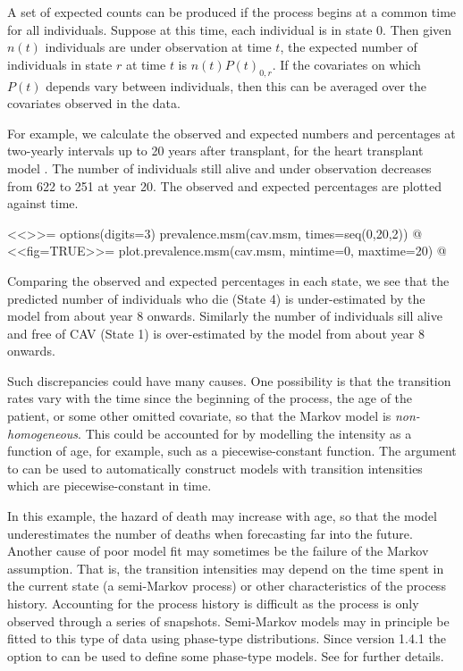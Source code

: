 A set of expected counts can be produced if the process begins at a
common time for all individuals.  Suppose at this time, each
individual is in state 0.  Then given $n(t)$ individuals are under
observation at time $t$, the expected number of individuals in state
$r$ at time $t$ is $n(t) P(t)_{0,r}$.   If the covariates on which
$P(t)$ depends vary between individuals, then this can be
averaged over the covariates observed in the data.

For example, we calculate the observed and expected numbers and
percentages at two-yearly intervals up to 20 years after transplant,
for the heart transplant model .  The number of
individuals still alive and under observation decreases from 622 to
251 at year 20.  The observed and expected percentages are plotted
against time.

<<>>=
options(digits=3)
prevalence.msm(cav.msm, times=seq(0,20,2))
@
<<fig=TRUE>>=
plot.prevalence.msm(cav.msm, mintime=0, maxtime=20)
@

Comparing the observed and expected percentages in each state,
we see that the predicted number of individuals who die (State 4) is
under-estimated by the model from about year 8 onwards.  Similarly the
number of individuals sill alive and free of CAV (State 1) is
over-estimated by the model from about year 8 onwards.

Such discrepancies could have many causes.  One possibility is that
the transition rates vary with the time since the beginning of the
process, the age of the patient, or some other omitted covariate, so
that the Markov model is {\em non-homogeneous}.  This could be
accounted for by modelling the intensity as a function of age, for
example, such as a piecewise-constant function.  The 
argument to  can be used to automatically construct
models with transition intensities which are piecewise-constant in
time.

In this example, the hazard of death may increase with age, so that
the model underestimates the number of deaths when forecasting far
into the future.  Another cause of poor model fit may sometimes be the
failure of the Markov assumption.  That is, the transition intensities
may depend on the time spent in the current state (a semi-Markov
process) or other characteristics of the process history.  Accounting
for the process history is difficult as the process is only observed
through a series of snapshots.  Semi-Markov 
models may in principle be fitted to this type of data using phase-type distributions.  Since
version 1.4.1 the  option to  can be used to 
define some phase-type models.  See  for further details.

